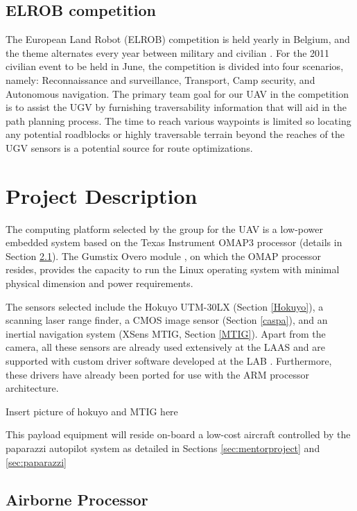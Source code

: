 \documentclass[a4paper,11pt]{report}
\begin{document}
\section{ELROB competition}

The European Land Robot (ELROB) competition is held yearly in Belgium, and the theme alternates every year between military and civilian \cite{elrob}. For the 2011 civilian event to be held in June, the competition is divided into four scenarios, namely: Reconnaissance and surveillance, Transport, Camp security, and Autonomous navigation. The primary team goal for our UAV in the competition is to assist the UGV by furnishing traversability information that will aid in the path planning process. The time to reach various waypoints is limited so locating any potential roadblocks or highly traversable terrain beyond the reaches of the UGV sensors is a potential source for route optimizations.

\chapter{Project Description}

The computing platform selected by the group for the UAV is a low-power embedded system based on the Texas Instrument OMAP3 processor (details in Section \ref{sec:AirborneProcessor}). The Gumstix Overo module \cite{Overo}, on which the OMAP processor resides, provides the capacity to run the Linux operating system with minimal physical dimension and power requirements. 

The sensors selected include the Hokuyo UTM-30LX (Section \ref{Hokuyo}), a scanning laser range finder, a CMOS image sensor (Section \ref{caspa}), and an inertial navigation system (XSens MTIG, Section \ref{MTIG}). Apart from the camera, all these sensors are already used extensively at the LAAS and are supported with custom driver software developed at the LAB \cite{robotpkg}. Furthermore, these drivers have already been ported for use with the ARM processor architecture.

Insert picture of hokuyo and MTIG here

This payload equipment will reside on-board a low-cost aircraft controlled by the paparazzi autopilot system as detailed in Sections \ref{sec:mentorproject} and \ref{sec:paparazzi}

\section{Airborne Processor}
\label{sec:AirborneProcessor}
\end{document}

